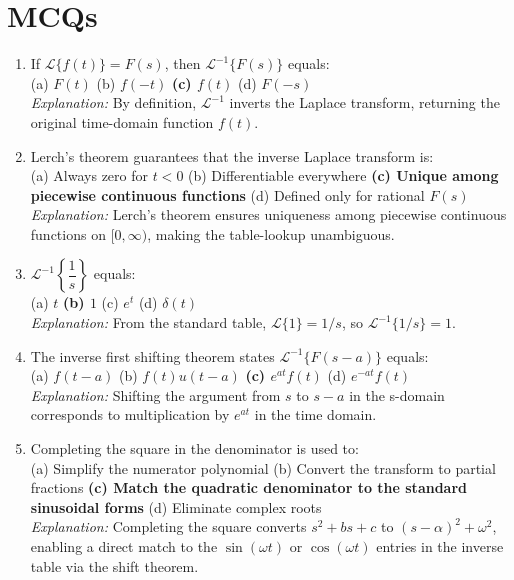 \documentclass[12pt,a4paper]{article}
\begin{document}
\section{MCQs}

\begin{enumerate}

\item If $\mathcal{L}\{f(t)\} = F(s)$, then $\mathcal{L}^{-1}\{F(s)\}$ equals:\\
(a) $F(t)$ \quad (b) $f(-t)$ \quad \textbf{(c) $f(t)$} \quad (d) $F(-s)$\\
\textit{Explanation:} By definition, $\mathcal{L}^{-1}$ inverts the Laplace transform,
returning the original time-domain function $f(t)$.

\item Lerch's theorem guarantees that the inverse Laplace transform is:\\
(a) Always zero for $t < 0$ \quad (b) Differentiable everywhere \quad
\textbf{(c) Unique among piecewise continuous functions} \quad
(d) Defined only for rational $F(s)$\\
\textit{Explanation:} Lerch's theorem ensures uniqueness among piecewise
continuous functions on $[0,\infty)$, making the table-lookup unambiguous.

\item $\mathcal{L}^{-1}\!\left\{\dfrac{1}{s}\right\}$ equals:\\
(a) $t$ \quad \textbf{(b) $1$} \quad (c) $e^t$ \quad (d) $\delta(t)$\\
\textit{Explanation:} From the standard table, $\mathcal{L}\{1\} = 1/s$,
so $\mathcal{L}^{-1}\{1/s\} = 1$.

\item The inverse first shifting theorem states $\mathcal{L}^{-1}\{F(s-a)\}$ equals:\\
(a) $f(t-a)$ \quad (b) $f(t)u(t-a)$ \quad \textbf{(c) $e^{at}f(t)$}
\quad (d) $e^{-at}f(t)$\\
\textit{Explanation:} Shifting the argument from $s$ to $s-a$ in the
s-domain corresponds to multiplication by $e^{at}$ in the time domain.

\item Completing the square in the denominator is used to:\\
(a) Simplify the numerator polynomial \quad
(b) Convert the transform to partial fractions \quad
\textbf{(c) Match the quadratic denominator to the standard sinusoidal forms}
\quad (d) Eliminate complex roots\\
\textit{Explanation:} Completing the square converts $s^2+bs+c$ to
$(s-\alpha)^2+\omega^2$, enabling a direct match to the $\sin(\omega t)$
or $\cos(\omega t)$ entries in the inverse table via the shift theorem.

\end{enumerate}
\end{document}
